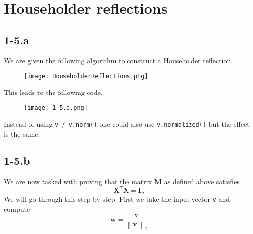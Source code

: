 \documentclass{article}
\begin{document}
\section*{Householder reflections}
\subsection*{1-5.a}
We are given the following algorithm to construct a Householder reflection.
\begin{figure}[!hbt]
    \centering
\texttt{[image: HouseholderReflections.png]}
\end{figure}

\noindent This leads to the following code.

\begin{figure}[!hbt]
    \centering
\texttt{[image: 1-5.a.png]}
\end{figure}

\noindent Instead of using \verb|v / v.norm()| one could also use \verb|v.normalized()| but the effect is the same.

\subsection*{1-5.b}
We are now tasked with proving that the matrix $\mathbf{M}$ as defined above satisfies
\begin{equation*}
\mathbf{X}^{\mathsf{T}}\mathbf{X} = \mathbf{I}_{n}
\end{equation*}
We will go through this step by step. First we take the input vector \verb|v| and compute
\begin{equation*}
    \mathbf{w} = \frac{\mathbf{v}}{\left\lVert \mathbf{v} \right\rVert_{2}}
\end{equation*}
\end{document}
